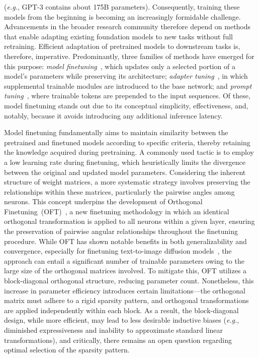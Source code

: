 (\emph{e.g.}, GPT-3 contains about 175B parameters). Consequently, training these models from the beginning is becoming an increasingly formidable challenge. Advancements in the broader research community therefore depend on methods that enable adapting existing foundation models to new tasks without full retraining. Efficient adaptation of pretrained models to downstream tasks is, therefore, imperative. Predominantly, three families of methods have emerged for this purpose: \emph{model finetuning}~\cite{hulora2022,zaken2022bitfit,guo2020parameter,raffel2020exploring,qiu2023controlling,zhang2022adaptive,chavan2023one}, which updates only a selected portion of a model’s parameters while preserving its architecture; \emph{adapter tuning}~\cite{rebuffi2017learning,houlsby2019parameter,pfeiffer2020adapterfusion,lin2020exploring,he2021towards}, in which supplemental trainable modules are introduced to the base network; and \emph{prompt tuning}~\cite{li2021prefix,lester2021power}, where trainable tokens are prepended to the input sequences. Of these, model finetuning stands out due to its conceptual simplicity, effectiveness, and, notably, because it avoids introducing any additional inference latency.

Model finetuning fundamentally aims to maintain similarity between the pretrained and finetuned models according to specific criteria, thereby retaining the knowledge acquired during pretraining. A commonly used tactic is to employ a low learning rate during finetuning, which heuristically limits the divergence between the original and updated model parameters. Considering the inherent structure of weight matrices, a more systematic strategy involves preserving the relationships within these matrices, particularly the pairwise angles among neurons. This concept underpins the development of Orthogonal Finetuning~(OFT)~\cite{qiu2023controlling}, a new finetuning methodology in which an identical orthogonal transformation is applied to all neurons within a given layer, ensuring the preservation of pairwise angular relationships throughout the finetuning procedure. While OFT has shown notable benefits in both generalizability and convergence, especially for finetuning text-to-image diffusion models~\cite{qiu2023controlling}, the approach can entail a significant number of trainable parameters owing to the large size of the orthogonal matrices involved. To mitigate this, OFT utilizes a block-diagonal orthogonal structure, reducing parameter count. Nonetheless, this increase in parameter efficiency introduces certain limitations—the orthogonal matrix must adhere to a rigid sparsity pattern, and orthogonal transformations are applied independently within each block. As a result, the block-diagonal design, while more efficient, may lead to less desirable inductive biases (\emph{e.g.}, diminished expressiveness and inability to approximate standard linear transformations), and critically, there remains an open question regarding optimal selection of the sparsity pattern.

